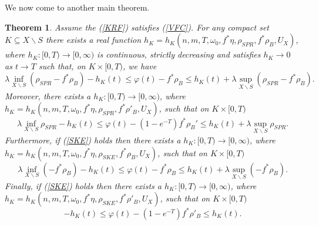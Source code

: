 \documentclass[12pt]{article}
\newtheorem{theorem}{Theorem}[section]
\numberwithin{equation}{section}
\begin{document}
\noindent We now come to another main theorem.

\begin{theorem}\label{C0_varphi_estimate}
Assume the (\ref{KRF}) satisfies (\ref{VFC}). For any compact set $K \subseteq X \backslash S$ there exists a real function $h_K = h_K(n,m,T,\omega_0,f^*\eta,\rho_{SPR},f^*\rho_B,U_X)$, where $h_K:[0,T) \to [0,\infty)$ is continuous, strictly decreasing and satisfies $h_K \to 0$ as $t \to T$ such that, on $K \times [0,T)$, we have
\begin{equation*}
    \lambda \inf_{X \backslash S} (\rho_{SPR} - f^*\rho_B) - h_K(t) \leq \varphi(t) - f^*\rho_B \leq h_K(t) + \lambda \sup_{X \backslash S} (\rho_{SPR} - f^*\rho_B).
\end{equation*}
Moreover, there exists a $h_K:[0,T) \to [0,\infty)$, where $h_K = h_K(n,m,T,\omega_0,f^*\eta,\rho_{SPR},f^*\rho'_B,U_X)$, such that on $K \times [0,T)$
\begin{equation*}
    \lambda \inf_{X \backslash S} \rho_{SPR} - h_K(t) \leq \varphi(t) - (1-e^{-T}) f^*\rho_B' \leq h_K(t) + \lambda \sup_{X \backslash S} \rho_{SPR}.
\end{equation*}
Furthermore, if (\ref{SKE}) holds then there exists a $h_K: [0,T) \to [0,\infty)$, where $h_K = h_K(n,m,T,\omega_0,f^*\eta,\rho_{SKE},f^*\rho_B, U_X)$, such that on $K \times [0,T)$
\begin{equation*}
    \lambda \inf_{X \backslash S} (- f^*\rho_B) - h_K(t) \leq \varphi(t) - f^*\rho_B \leq h_K(t) + \lambda \sup_{X \backslash S} (- f^*\rho_B).
\end{equation*}
Finally, if (\ref{SKE}) holds then there exists a $h_K: [0,T) \to [0,\infty)$, where $h_K = h_K(n,m,T,\omega_0,f^*\eta,\rho_{SKE},f^*\rho'_B, U_X)$, such that on $K \times [0,T)$
\begin{equation*}
     - h_K(t) \leq \varphi(t) - (1-e^{-T})f^*\rho'_B \leq h_K(t).
\end{equation*}
\end{theorem}
\end{document}
